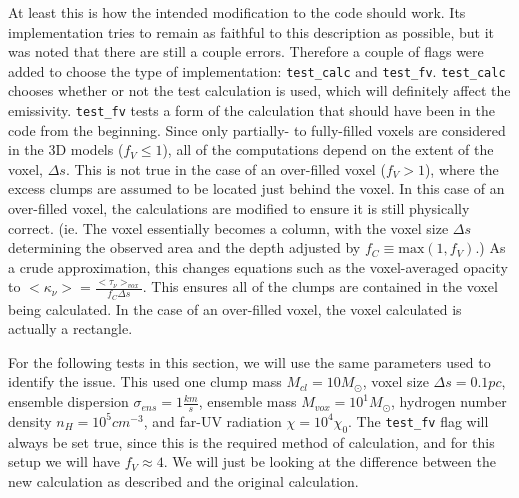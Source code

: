 \documentclass[a4paper]{article}
\begin{document}
    At least this is how the intended modification to the code should work.
    Its implementation tries to remain as faithful to this description as possible, but it was noted that there are still a couple errors.
    Therefore a couple of flags were added to choose the type of implementation: \texttt{test\_calc} and \texttt{test\_fv}.
    \texttt{test\_calc} chooses whether or not the test calculation is used, which will definitely affect the emissivity.
    \texttt{test\_fv} tests a form of the calculation that should have been in the code from the beginning.
    Since only partially- to fully-filled voxels are considered in the 3D models (\(f_V \leq 1\)), all of the computations depend on the extent of the voxel, \(\Delta s\).
    This is not true in the case of an over-filled voxel (\(f_V > 1\)), where the excess clumps are assumed to be located just behind the voxel.
    In this case of an over-filled voxel, the calculations are modified to ensure it is still physically correct.
    (ie. The voxel essentially becomes a column, with the voxel size \(\Delta s\) determining the observed area and the depth adjusted by \(f_C \equiv \mathrm{max}(1, f_V)\).)
    As a crude approximation, this changes equations such as the voxel-averaged opacity to \(<\kappa_\nu> = \frac{<\tau_\nu>_{vox}}{f_C \Delta s}\).
    This ensures all of the clumps are contained in the voxel being calculated.
    In the case of an over-filled voxel, the voxel calculated is actually a rectangle.

    For the following tests in this section, we will use the same parameters used to identify the issue.
    This used one clump mass \(M_{cl} = 10 M_\odot\),
    voxel size \(\Delta s = 0.1 pc\),
    ensemble dispersion \(\sigma_{ens} = 1 \frac{km}{s}\),
    ensemble mass \(M_{vox} = 10^{1} M_\odot\),
    hydrogen number density \(n_H = 10^{5} cm^{-3}\),
    and far-UV radiation \(\chi = 10^{4} \chi_0\).
    The \texttt{test\_fv} flag will always be set true, since this is the required method of calculation, and for this setup we will have \(f_V \approx 4\).
    We will just be looking at the difference between the new calculation as described and the original calculation.
\end{document}
